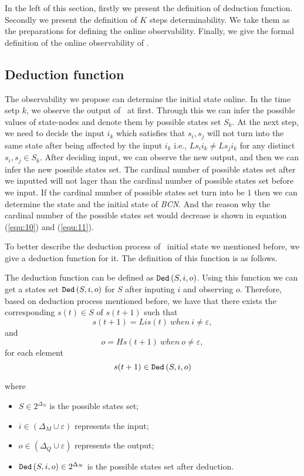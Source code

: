 In the left of this section, firstly we present the definition of deduction function. Secondly we present the definition of $K$ steps determinability. We take them as the preparations for defining the online observability. Finally, we give the formal definition of the online observability of \BCNs. 
\subsection{Deduction function}
The observability we propose can determine the initial state online.
 In the time setp $k$, we observe the output of \BCNs\ at first. Through this we can infer the possible values of state-nodes and denote them by possible states set $S_k$. %
 At the next step, we need to decide the input $i_k$ which satisfies that %
$s_i, s_j$ 
 will not turn into the same state after being affected by the input $i_k$ i.e., $Ls_i i_k\neq Ls_j i_k$ for any distinct $s_i, s_j\in S_k$. After deciding input, we can observe the new output, and then we can infer the new possible states set. The cardinal number of possible states set after we inputted will not lager than the cardinal number of possible states set before we input. If the cardinal number of possible states set turn into be $1$ then we can determine the state and the initial state of {\em BCN}. And the reason why the cardinal number of the possible states set would decrease is shown in equation (\ref{equ:10}) and (\ref{equ:11}). 
 
To better describe the deduction process of \BCN\ initial state we mentioned before, we give a deduction function for it. The definition of this function is as follows.
\begin{definition} The deduction function can be defined as ${\tt Ded}\left(S, i, o\right)$. Using this function we can get a states set ${\tt Ded}\left(S, i, o\right)$ for $S$ after inputing $i$ and observing $o$. Therefore, based on deduction process mentioned before, we have that there exists the corresponding $s(t)\in S$ of $s(t+1)$ such that \[s(t+1)=Lis(t)\ when\ i\neq \varepsilon, \] and \[o=Hs(t+1)\ when\ o\neq \varepsilon, \]
for each element \[s(t+1)\in {\tt Ded}\left(S, i, o\right)\]
\end{definition}
where   
\begin{itemize}
  \item $S\in 2^{\Delta_N}$ is the possible states set;
  \item $i\in (\Delta_M\cup\varepsilon)$ represents the input;
  \item $o\in(\Delta_Q\cup\varepsilon)$ represents the output; 
  \item ${\tt Ded}\left(S, i, o\right)\in 2^{\Delta_N}$ is the possible states set after deduction.
\end{itemize} 
 
